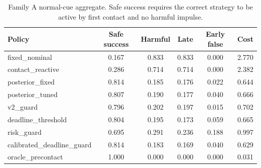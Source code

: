 \begin{table}[t]
\centering
\small
\caption{Family A normal-cue aggregate. Safe success requires the correct strategy to be active by first contact and no harmful impulse.}
\label{tab:main-normal}
\begin{tabular}{lccccc}
\toprule
Policy & Safe success & Harmful & Late & Early false & Cost \\
\midrule
fixed\_nominal & 0.167 & 0.833 & 0.833 & 0.000 & 2.770 \\
contact\_reactive & 0.286 & 0.714 & 0.714 & 0.000 & 2.382 \\
posterior\_fixed & 0.814 & 0.185 & 0.176 & 0.022 & 0.644 \\
posterior\_tuned & 0.807 & 0.190 & 0.177 & 0.040 & 0.666 \\
v2\_guard & 0.796 & 0.202 & 0.197 & 0.015 & 0.702 \\
deadline\_threshold & 0.804 & 0.195 & 0.173 & 0.059 & 0.665 \\
risk\_guard & 0.695 & 0.291 & 0.236 & 0.188 & 0.997 \\
calibrated\_deadline\_guard & 0.814 & 0.183 & 0.169 & 0.040 & 0.629 \\
oracle\_precontact & 1.000 & 0.000 & 0.000 & 0.000 & 0.031 \\
\bottomrule
\end{tabular}
\end{table}
